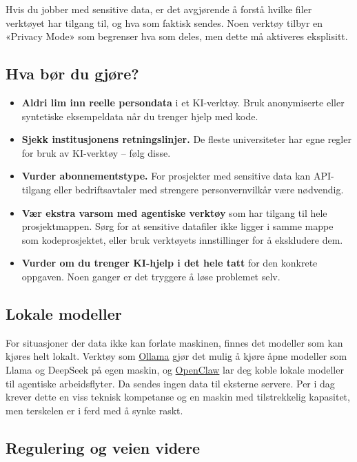 \documentclass[
  norsk,
  letterpaper,
  DIV=11,
  numbers=noendperiod]{scrreprt}
\providecommand{\tightlist}{%
  \setlength{\itemsep}{0pt}\setlength{\parskip}{0pt}}
\theoremstyle{definition}
\theoremstyle{remark}
\begin{document}
Hvis du jobber med sensitive data, er det avgjørende å forstå hvilke
filer verktøyet har tilgang til, og hva som faktisk sendes. Noen verktøy
tilbyr en «Privacy Mode» som begrenser hva som deles, men dette må
aktiveres eksplisitt.

\subsection{Hva bør du gjøre?}\label{hva-buxf8r-du-gjuxf8re}

\begin{itemize}
\tightlist
\item
  \textbf{Aldri lim inn reelle persondata} i et KI-verktøy. Bruk
  anonymiserte eller syntetiske eksempeldata når du trenger hjelp med
  kode.
\item
  \textbf{Sjekk institusjonens retningslinjer.} De fleste universiteter
  har egne regler for bruk av KI-verktøy -- følg disse.
\item
  \textbf{Vurder abonnementstype.} For prosjekter med sensitive data kan
  API-tilgang eller bedriftsavtaler med strengere personvernvilkår være
  nødvendig.
\item
  \textbf{Vær ekstra varsom med agentiske verktøy} som har tilgang til
  hele prosjektmappen. Sørg for at sensitive datafiler ikke ligger i
  samme mappe som kodeprosjektet, eller bruk verktøyets innstillinger
  for å ekskludere dem.
\item
  \textbf{Vurder om du trenger KI-hjelp i det hele tatt} for den
  konkrete oppgaven. Noen ganger er det tryggere å løse problemet selv.
\end{itemize}

\subsection{Lokale modeller}\label{lokale-modeller}

For situasjoner der data ikke kan forlate maskinen, finnes det modeller
som kan kjøres helt lokalt. Verktøy som
\href{https://ollama.com/}{Ollama} gjør det mulig å kjøre åpne modeller
som Llama og DeepSeek på egen maskin, og
\href{https://github.com/openclaw/openclaw}{OpenClaw} lar deg koble
lokale modeller til agentiske arbeidsflyter. Da sendes ingen data til
eksterne servere. Per i dag krever dette en viss teknisk kompetanse og
en maskin med tilstrekkelig kapasitet, men terskelen er i ferd med å
synke raskt.

\subsection{Regulering og veien
videre}\label{regulering-og-veien-videre}
\end{document}
